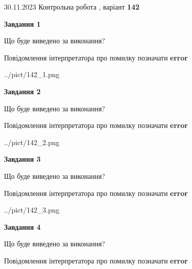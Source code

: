 \documentclass[12pt, ukrainian]{article}
\begin{document}
{{30.11.2023 Контрольна робота , варіант  \No \textbf { 142 }\par}}
{




{\begin {center}\textbf{Завдання 1}\end {center}}\par
Що буде виведено за виконання? \par
Повідомлення інтерпретатора про помилку позначати \textbf{error}

\begin{center}
	{../pict/142_1.png}
\end{center}
\newpage

{\begin {center}\textbf{Завдання 2}\end {center}}\par
Що буде виведено за виконання? \par
Повідомлення інтерпретатора про помилку позначати \textbf{error}

\begin{center}
	{../pict/142_2.png}
\end{center}
\newpage

{\begin {center}\textbf{Завдання 3}\end {center}}\par
Що буде виведено за виконання? \par
Повідомлення інтерпретатора про помилку позначати \textbf{error}

\begin{center}
	{../pict/142_3.png}
\end{center}
\newpage

{\begin {center}\textbf{Завдання 4}\end {center}}\par
Що буде виведено за виконання? \par
Повідомлення інтерпретатора про помилку позначати \textbf{error}

}
\end{document}
